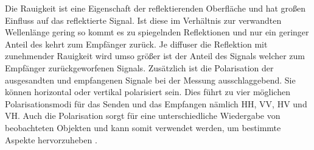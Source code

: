 Die Rauigkeit ist eine Eigenschaft der reflektierenden Oberfläche und hat großen Einfluss auf das reflektierte Signal. Ist diese im Verhältnis
zur verwandten Wellenlänge gering so kommt es zu spiegelnden Reflektionen und nur ein geringer Anteil des kehrt zum Empfänger zurück. Je diffuser
die Reflektion mit zunehmender Rauigkeit wird umso größer ist der Anteil des Signals welcher zum Empfänger zurückgeworfenen Signals. 
Zusätzlich ist die Polarisation der ausgesandten und empfangenen Signale bei der Messung ausschlaggebend. Sie können horizontal oder 
vertikal polarisiert sein. Dies führt zu vier möglichen Polarisationsmodi für das Senden und das Empfangen nämlich HH, VV, HV und VH. Auch die 
Polarisation sorgt für eine unterschiedliche Wiedergabe von beobachteten Objekten und kann somit verwendet werden, um bestimmte Aspekte hervorzuheben
 \cite{einfuehrung_in_fernerkundung}. 

